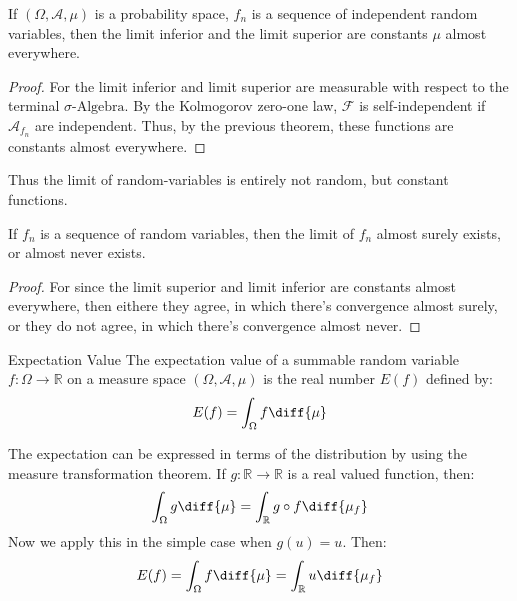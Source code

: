     \begin{theorem}
        If $(\Omega,\mathcal{A},\mu)$ is a probability space,
        $f_{n}$ is a sequence of independent random variables,
        then the limit inferior and the limit superior are
        constants $\mu$ almost everywhere.
    \end{theorem}
    \begin{proof}
        For the limit inferior and limit superior are measurable
        with respect to the terminal $\sigma\textrm{-Algebra}$.
        By the Kolmogorov zero-one law, $\mathcal{F}$ is
        self-independent if $\mathcal{A}_{f_{n}}$ are independent.
        Thus, by the previous theorem, these functions are constants
        almost everywhere.
    \end{proof}
    Thus the limit of random-variables is entirely not random, but
    constant functions.
    \begin{theorem}
        If $f_{n}$ is a sequence of random variables, then the
        limit of $f_{n}$ almost surely exists, or almost never
        exists.
    \end{theorem}
    \begin{proof}
        For since the limit superior and limit inferior are
        constants almost everywhere, then eithere they agree,
        in which there's convergence almost surely, or they do
        not agree, in which there's convergence almost never.
    \end{proof}
    \begin{ldefinition}{Expectation Value}
        The expectation value of a summable random variable
        $f:\Omega\rightarrow\mathbb{R}$ on a measure space
        $(\Omega,\mathcal{A},\mu)$ is the real number
        $E(f)$ defined by:
        \begin{equation}
            E(f)=\int_{\Omega}f\diff{\mu}
        \end{equation}
    \end{ldefinition}
    The expectation can be expressed in terms of the distribution
    by using the measure transformation theorem. If
    $g:\mathbb{R}\rightarrow\mathbb{R}$ is a real valued function,
    then:
    \begin{equation}
        \int_{\Omega}g\diff{\mu}=
        \int_{\mathbb{R}}g\circ{f}\diff{\mu_{f}}
    \end{equation}
    Now we apply this in the simple case when $g(u)=u$. Then:
    \begin{equation}
        E(f)=\int_{\Omega}f\diff{\mu}
        =\int_\mathbb{R}u\diff{\mu_{f}}
    \end{equation}
